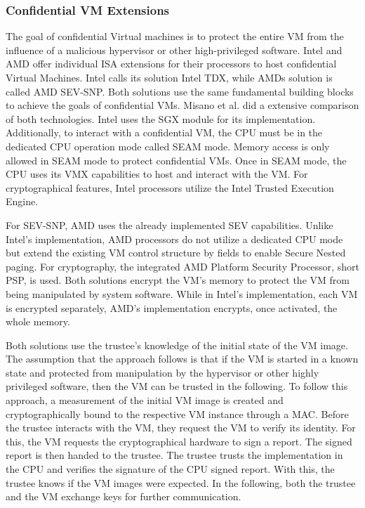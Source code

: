 \subsubsection{Confidential VM Extensions}
The goal of confidential Virtual machines is to protect the entire VM from the influence of a malicious hypervisor or
other high-privileged software. Intel and AMD offer individual ISA extensions for their processors to host confidential
Virtual Machines. Intel calls its solution Intel TDX, while AMDs solution is called AMD
SEV-SNP.\cite{tdx_whitepaper,kaplan_amd_2020} Both solutions use the
same fundamental building blocks to achieve the goals of confidential VMs. Misano et al. did a extensive comparison of
both technologies.\cite{misono_confidential_2024}
Intel uses the SGX module for its implementation. Additionally, to interact with a confidential VM, the CPU must be in
the dedicated CPU operation mode
called SEAM mode. Memory access is only allowed in SEAM mode to protect confidential VMs. Once in SEAM mode, the CPU
uses its VMX capabilities to host and interact with the VM. For cryptographical features, Intel processors utilize the
Intel Trusted Execution Engine.

For SEV-SNP, AMD uses the already implemented SEV capabilities. Unlike Intel's implementation, AMD processors do not
utilize a dedicated CPU mode but extend the existing VM control structure by fields to enable Secure Nested paging. For
cryptography, the integrated AMD Platform Security Processor, short PSP, is used. Both solutions encrypt the VM's
memory to protect the VM from being manipulated by system software. While in Intel's implementation, each VM is
encrypted separately, AMD's implementation encrypts, once activated, the whole memory.

Both solutions use the trustee's knowledge of the initial state of the VM image. The assumption that the approach
follows is that if the VM is started in a known state and protected from manipulation by the hypervisor or other highly
privileged software, then the VM can be trusted in the following. To follow this approach, a measurement of the initial
VM image is created and cryptographically bound to the respective VM instance through a MAC. Before the trustee
interacts with the VM, they request the VM to verify its identity. For this, the VM requests the cryptographical
hardware to sign a report. The signed report is then handed to the trustee. The trustee trusts the implementation in
the CPU and verifies the signature of the CPU signed report. With this, the trustee knows if the VM images were
expected. In the following, both the trustee and the VM exchange keys for further communication.

